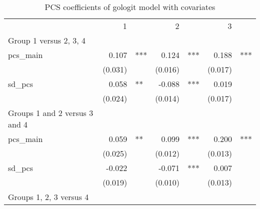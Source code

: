 \begin{table}[!h]
\caption{PCS coefficients of gologit model with covariates}
\centering
\begin{tabular}{lllllll}
\cline{1-7}
\multicolumn{1}{r}{} &
  \multicolumn{2}{c}{1} &
  \multicolumn{2}{c}{2} &
  \multicolumn{2}{c}{3} \\
\cline{1-7}
\multicolumn{1}{l}{\hspace*{-1em}Group 1 versus 2, 3, 4 } \\
\multicolumn{1}{l}{pcs\_main} &
  \multicolumn{1}{r}{0.107} &
  \multicolumn{1}{l}{***} &
  \multicolumn{1}{r}{0.124} &
  \multicolumn{1}{l}{***} &
  \multicolumn{1}{r}{0.188} &
  \multicolumn{1}{l}{***} \\
\multicolumn{1}{l}{} &
  \multicolumn{1}{r}{(0.031)} &
  \multicolumn{1}{l}{} &
  \multicolumn{1}{r}{(0.016)} &
  \multicolumn{1}{l}{} &
  \multicolumn{1}{r}{(0.017)} &
  \multicolumn{1}{l}{} \\
\multicolumn{1}{l}{sd\_pcs} &
  \multicolumn{1}{r}{0.058} &
  \multicolumn{1}{l}{**} &
  \multicolumn{1}{r}{-0.088} &
  \multicolumn{1}{l}{***} &
  \multicolumn{1}{r}{0.019} &
  \multicolumn{1}{l}{} \\
\multicolumn{1}{l}{} &
  \multicolumn{1}{r}{(0.024)} &
  \multicolumn{1}{l}{} &
  \multicolumn{1}{r}{(0.014)} &
  \multicolumn{1}{l}{} &
  \multicolumn{1}{r}{(0.017)} &
  \multicolumn{1}{l}{} \\
\multicolumn{1}{l}{\hspace*{-1em}Groups 1 and 2 versus 3 and 4 } \\
\multicolumn{1}{l}{pcs\_main} &
  \multicolumn{1}{r}{0.059} &
  \multicolumn{1}{l}{**} &
  \multicolumn{1}{r}{0.099} &
  \multicolumn{1}{l}{***} &
  \multicolumn{1}{r}{0.200} &
  \multicolumn{1}{l}{***} \\
\multicolumn{1}{l}{} &
  \multicolumn{1}{r}{(0.025)} &
  \multicolumn{1}{l}{} &
  \multicolumn{1}{r}{(0.012)} &
  \multicolumn{1}{l}{} &
  \multicolumn{1}{r}{(0.013)} &
  \multicolumn{1}{l}{} \\
\multicolumn{1}{l}{sd\_pcs} &
  \multicolumn{1}{r}{-0.022} &
  \multicolumn{1}{l}{} &
  \multicolumn{1}{r}{-0.071} &
  \multicolumn{1}{l}{***} &
  \multicolumn{1}{r}{0.007} &
  \multicolumn{1}{l}{} \\
\multicolumn{1}{l}{} &
  \multicolumn{1}{r}{(0.019)} &
  \multicolumn{1}{l}{} &
  \multicolumn{1}{r}{(0.010)} &
  \multicolumn{1}{l}{} &
  \multicolumn{1}{r}{(0.013)} &
  \multicolumn{1}{l}{} \\
\multicolumn{1}{l}{\hspace*{-1em}Groups 1, 2, 3 versus 4} \\

\end{tabular}
\end{table}
